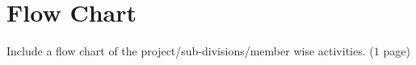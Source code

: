 
\chapter{Flow Chart}
\label{Chapter8}

Include a flow chart of the project/sub-divisions/member wise activities. ($1$ page)